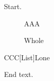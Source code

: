 \documentclass{article}
\begin{document}
Start.
\begin{figure}
\begin{minipage}{.4\textwidth}AAA\end{minipage}
\caption{Whole}
\end{figure}
\begin{minipage}{.4\textwidth}CCC[List]{Lone}\end{minipage}

End text.
\end{document}
